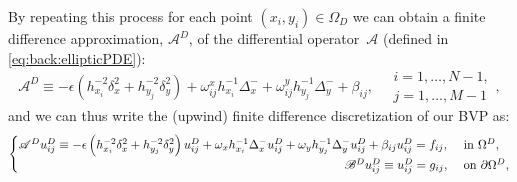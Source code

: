 By repeating this process for each point $(x_i,y_i)\in\Omega_D$
we can obtain a finite difference approximation, $\mathscr{A}^D$, of the
differential operator~$\mathscr{A}$ (defined in \eqref{eq:back:ellipticPDE}):
%
%
\begin{equation}\label{eq:back:2DdiscrOp}
\mathscr{A}^D \equiv-\epsilon \left( h_{x_{i}}^{-2}\delta^2_x + h_{y_{j}}^{-2}\delta^2_y\right) + \omega^x_{ij} h_{x_{i}}^{-1}\Delta^{-}_{x} +
\omega^y_{ij} h_{y_{j}}^{-1}\Delta^{-}_{y} + \beta_{ij},\quad \substack{i=1,\ldots,N-1,\\ j=1,\ldots,M-1},
\end{equation}
%
and we can thus write the (upwind) finite difference discretization of our BVP as:
%
\begin{equation}\label{eq:back:2DbvpD}
\begin{cases}
\mathscr{A}^Du^D_{ij}\equiv-\epsilon \left( h_{x_{i}}^{-2}\delta^2_x +
h_{y_{j}}^{-2}\delta^2_y\right) u^D_{ij} + \omega_x h_{x_{i}}^{-1}\Delta^{-}_{x} u^D_{ij} + \omega_y h_{y_{j}}^{-1}\Delta^{-}_{y}u^D_{ij} + \beta_{ij}
u^D_{ij}  = f_{ij},
& \text{ in } \Omega^D,\\
\hspace{9.35cm} \mathscr{B}^Du^D_{ij}\equiv u^D_{ij} = g_{ij}, &
\text{ on } \partial\Omega^D,\\
\end{cases}
\end{equation}
